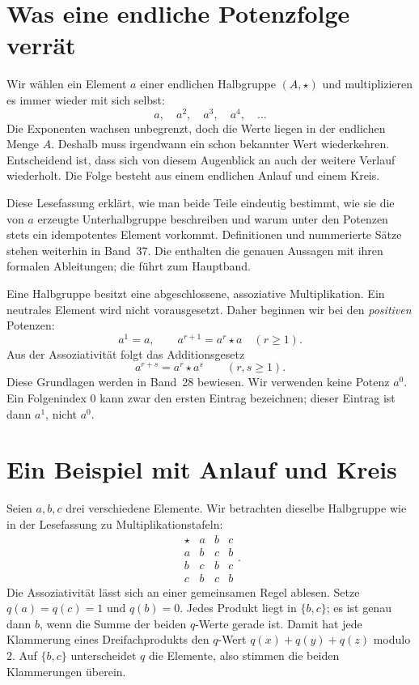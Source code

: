 \hypertarget{index-period.reading}{}
\section*{Was eine endliche Potenzfolge verrät}

Wir wählen ein Element \(a\) einer endlichen Halbgruppe \((A,\star)\)
und multiplizieren es immer wieder mit sich selbst:
\[
 a,\quad a^2,\quad a^3,\quad a^4,\quad\ldots
\]
Die Exponenten wachsen unbegrenzt, doch die Werte liegen in der endlichen
Menge \(A\). Deshalb muss irgendwann ein schon bekannter Wert wiederkehren.
Entscheidend ist, dass sich von diesem Augenblick an auch der weitere Verlauf
wiederholt. Die Folge besteht aus einem endlichen Anlauf und einem Kreis.

Diese Lesefassung erklärt, wie man beide Teile eindeutig bestimmt,
wie sie die von \(a\) erzeugte Unterhalbgruppe beschreiben und warum
unter den Potenzen stets ein idempotentes Element vorkommt.
Definitionen und nummerierte Sätze stehen weiterhin in Band~37.
Die \IndexPeriodProofsLink{} enthalten die genauen Aussagen mit ihren
formalen Ableitungen; die \IndexPeriodMainLink{} führt zum Hauptband.

Eine Halbgruppe besitzt eine abgeschlossene, assoziative Multiplikation.
Ein neutrales Element wird nicht vorausgesetzt. Daher beginnen wir
bei den \emph{positiven} Potenzen:
\[
 a^1=a,\qquad a^{r+1}=a^r\star a\quad(r\geq1).
\]
Aus der Assoziativität folgt das Additionsgesetz
\[
 a^{r+s}=a^r\star a^s\qquad(r,s\geq1).
\]
Diese Grundlagen werden in Band~28 bewiesen. Wir verwenden keine
Potenz \(a^0\). Ein Folgenindex \(0\) kann zwar den ersten Eintrag
bezeichnen; dieser Eintrag ist dann \(a^1\), nicht \(a^0\).

\section*{Ein Beispiel mit Anlauf und Kreis}

Seien \(a,b,c\) drei verschiedene Elemente. Wir betrachten dieselbe
Halbgruppe wie in der Lesefassung zu Multiplikationstafeln:
\[
 \begin{array}{c|ccc}
 \star&a&b&c\\\hline
 a&b&c&b\\
 b&c&b&c\\
 c&b&c&b
 \end{array}.
\]
Die Assoziativität lässt sich an einer gemeinsamen Regel ablesen.
Setze \(q(a)=q(c)=1\) und \(q(b)=0\). Jedes Produkt liegt in \(\{b,c\}\);
es ist genau dann \(b\), wenn die Summe der beiden \(q\)-Werte gerade ist.
Damit hat jede Klammerung eines Dreifachprodukts den \(q\)-Wert
\(q(x)+q(y)+q(z)\) modulo \(2\). Auf \(\{b,c\}\) unterscheidet \(q\)
die Elemente, also stimmen die beiden Klammerungen überein.

